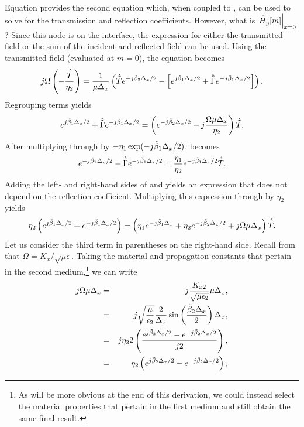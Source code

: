 Equation  provides the second equation which,
when coupled to , can be used to solve for the
transmission and reflection coefficients.  However, what is
$\left.\hat{H}_y^{}\!\left[m\right]\right|_{x=0}$?  Since this node is on the
interface, the expression for either the transmitted field or the sum
of the incident and reflected field can be used.  Using the
transmitted field (evaluated at $m=0$), the equation becomes
\begin{equation}
  j\Omega \left(-\frac{\hat{\tilde{T}}}{\eta_2}\right) =
  \frac{1}{\mu\Delta_x}
     \left(\hat{\tilde{T}} e^{-j\tilde{\beta}_2\Delta_x/2} - 
           \left[e^{j\tilde{\beta}_1\Delta_x/2} + \hat{\tilde{\Gamma}} e^{-j\tilde{\beta}_1\Delta_x/2}\right]\right).
  \label{eq:usedTrans}
\end{equation}
Regrouping terms yields
\begin{equation}
  e^{j\tilde{\beta}_1\Delta_x/2} + \hat{\tilde{\Gamma}} e^{-j\tilde{\beta}_1\Delta_x/2} =
  \left(e^{-j\tilde{\beta}_2\Delta_x/2} + j\frac{\Omega\mu\Delta_x}{\eta_2}\right) \hat{\tilde{T}}.
  \label{eq:magContinuityI}
\end{equation}
After multiplying through by $-\eta_1\exp(-j\tilde{\beta}_1\Delta_x/2)$,
 becomes
\begin{equation}
  e^{-j\tilde{\beta}_1\Delta_x/2} - \hat{\tilde{\Gamma}} e^{-j\tilde{\beta}_1\Delta_x/2} =
  \frac{\eta_1}{\eta_2} e^{-j\tilde{\beta}_1\Delta_x/2} \hat{\tilde{T}}.
  \label{eq:magContinuityII}
\end{equation}
Adding the left- and right-hand sides of  and
 yields an expression that does not depend
on the reflection coefficient.  Multiplying this expression through by
$\eta_2$ yields
\begin{equation}
  \eta_2\left(e^{j\tilde{\beta}_1\Delta_x/2} + e^{-j\tilde{\beta}_1\Delta_x/2}\right) =
  \left(\eta_1 e^{-j\tilde{\beta}_1\Delta_x} + \eta_2 e^{-j\tilde{\beta}_2\Delta_x/2} +
  j\Omega\mu\Delta_x\right) \hat{\tilde{T}}.
  \label{eq:solvingForTrans}
\end{equation}
Let us consider the third term in parentheses on the right-hand side.
Recall from  that $\Omega =
K_x/\sqrt{\mu\epsilon}$.  Taking the material and propagation
constants that pertain in the second medium,\footnote{As will be more
  obvious at the end of this derivation, we could instead select the
  material properties that pertain in the first medium and still obtain
  the same final result.} we can write
\begin{eqnarray}
  j\Omega\mu\Delta_x &=& 
    j\frac{K_{x2}}{\sqrt{\mu\epsilon_2}}\mu\Delta_x,
   \label{eq:transConversionI}
  \\
  &=&
   j\sqrt{\frac{\mu}{\epsilon_2}}\frac{2}{\Delta_x}
      \sin\left(\frac{\tilde{\beta}_2\Delta_x}{2}\right)\Delta_x,
   \label{eq:transConversionII}
  \\
  &=&
   j \eta_2 2
      \left(\frac{e^{j\tilde{\beta}_2\Delta_x/2} - e^{-j\tilde{\beta}_2\Delta_x/2}}{j2}\right),
 \\
  &=&
   \eta_2 \left(e^{j\tilde{\beta}_2\Delta_x/2} - e^{-j\tilde{\beta}_2\Delta_x/2}\right),
   \label{eq:transConversionIV}
\end{eqnarray}
